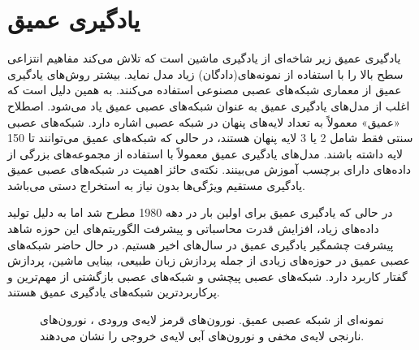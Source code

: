 \section{یادگیری عمیق}
	یادگیری عمیق
	زیر شاخه‌ای از یادگیری ماشین
	  است که تلاش می‌کند مفاهیم انتزاعی سطح بالا را با استفاده از نمونه‌های(دادگان) زیاد مدل نماید. بیشتر روش‌های یادگیری عمیق از معماری شبکه‌های عصبی مصنوعی
	  استفاده می‌کنند‌. به همین دلیل است که اغلب از مدل‌های یادگیری عمیق به عنوان شبکه‌های عصبی عمیق یاد می‌شود. اصطلاح «عمیق» معمولاً به تعداد لایه‌های پنهان در شبکه عصبی اشاره دارد. شبکه‌های عصبی سنتی فقط شامل 2 یا 3 لایه پنهان هستند، در حالی که شبکه‌های عمیق می‌توانند تا 150 لایه داشته باشند. مدل‌های یادگیری عمیق معمولاً با استفاده از مجموعه‌های بزرگی از داده‌های دارای برچسب آموزش می‌بینند. نکته‌ی حائز اهمیت در شبکه‌های عصبی عمیق یادگیری مستقیم ویژگی‌ها بدون نیاز به استخراج دستی می‌باشد.
	  
	  در حالی که یادگیری عمیق برای اولین بار در دهه 1980 مطرح شد اما به دلیل تولید داده‌های زیاد، افزایش  قدرت محاسباتی و پیشرفت الگوریتم‌های این حوزه شاهد پیشرفت چشمگیر یادگیری عمیق در سال‌های اخیر هستیم. در حال حاضر شبکه‌های عصبی عمیق در حوزه‌های زیادی از جمله پردازش زبان طبیعی، بینایی ماشین، پردازش گفتار کاربرد دارد. شبکه‌های عصبی پیچشی و شبکه‌های عصبی بازگشتی از مهم‌ترین و پرکاربردترین شبکه‌های یادگیری عمیق هستند.
	\begin{figure}
	  	\caption[نمونه‌ای از شبکه عصبی عمیق]{نمونه‌ای از شبکه عصبی عمیق. نورون‌های قرمز لایه‌ی ورودی ، نورون‌های نارنجی لایه‌ی مخفی و نورون‌های آبی لایه‌ی خروجی را نشان ‌می‌دهند.}
	  	\label{fig:DNN}
	\end{figure}

